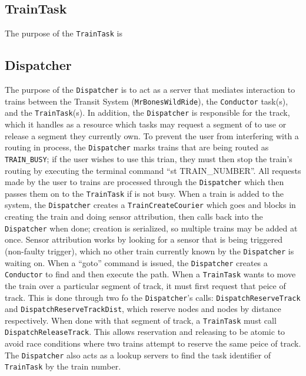 \documentclass[12pt]{article}
\begin{document}
\subsection{TrainTask}
The purpose of the \texttt{TrainTask} is
\\[1\baselineskip]
\subsection{Dispatcher}
The purpose of the \texttt{Dispatcher} is to act as a server that mediates interaction to trains between the Transit System (\texttt{MrBonesWildRide}), the \texttt{Conductor} task(s), and the \texttt{TrainTask}(s).  In addition, the \texttt{Dispatcher} is responsible for the track, which it handles as a resource which tasks may request a segment of to use or release a segment they currently own.  To prevent the user from interfering with a routing in process, the \texttt{Dispatcher} marks trains that are being routed as \texttt{TRAIN\_BUSY}; if the user wishes to use this trian, they must then stop the train's routing by executing the terminal command ``st TRAIN\_NUMBER''.  All requests made by the user to trains are processed through the \texttt{Dispatcher} which then passes them on to the \texttt{TrainTask} if is not busy.  When a train is added to the system, the \texttt{Dispatcher} creates a \texttt{TrainCreateCourier} which goes and blocks in creating the train and doing sensor attribution, then calls back into the \texttt{Dispatcher} when done; creation is serialized, so multiple trains may be added at once.  Sensor attribution works by looking for a sensor that is being triggered (non-faulty trigger), which no other train currently known by the \texttt{Dispatcher} is waiting on.  When a ``goto'' command is issued, the \texttt{Dispatcher} creates a \texttt{Conductor} to find and then execute the path.  When a \texttt{TrainTask} wants to move the train over a particular segment of track, it must first request that peice of track.  This is done through two fo the \texttt{Dispatcher}'s calls: \texttt{DispatchReserveTrack} and \texttt{DispatchReserveTrackDist}, which reserve nodes and nodes by distance respectively.  When done with that segment of track, a \texttt{TrainTask} must call \texttt{DispatchReleaseTrack}.  This allows reservation and releasing to be atomic to avoid race conditions where two trains attempt to reserve the same peice of track.  The \texttt{Dispatcher} also acts as a lookup servers to find the task identifier of \texttt{TrainTask} by the train number.
\\[1\baselineskip]
\end{document}
